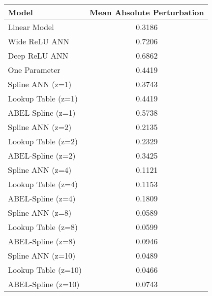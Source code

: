 \begin{table}
\begin{tabular}{|l|c|}
\hline
Model & Mean Absolute Perturbation \\ \hline
Linear Model & 0.3186 \\ \hline
Wide ReLU ANN & 0.7206 \\ \hline
Deep ReLU ANN & 0.6862 \\ \hline
One Parameter & 0.4419 \\ \hline
Spline ANN (z=1) & 0.3743 \\ \hline
Lookup Table (z=1) & 0.4419 \\ \hline
ABEL-Spline (z=1) & 0.5738 \\ \hline
Spline ANN (z=2) & 0.2135 \\ \hline
Lookup Table (z=2) & 0.2329 \\ \hline
ABEL-Spline (z=2) & 0.3425 \\ \hline
Spline ANN (z=4) & 0.1121 \\ \hline
Lookup Table (z=4) & 0.1153 \\ \hline
ABEL-Spline (z=4) & 0.1809 \\ \hline
Spline ANN (z=8) & 0.0589 \\ \hline
Lookup Table (z=8) & 0.0599 \\ \hline
ABEL-Spline (z=8) & 0.0946 \\ \hline
Spline ANN (z=10) & 0.0489 \\ \hline
Lookup Table (z=10) & 0.0466 \\ \hline
ABEL-Spline (z=10) & 0.0743 \\ \hline
\end{tabular}
\end{table}
